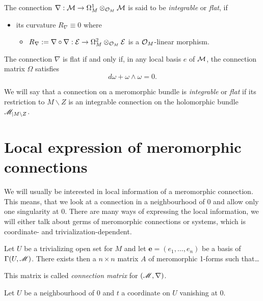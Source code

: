 \begin{defn}[Flatness (0.12.2)]
  The connection $\nabla:\mathcal{M}\to \Omega_M^1\otimes_{\mathcal{O}_M}\mathcal{M}$ is said to be
  \emph{integrable} or \emph{flat}, if
  \begin{itemize}
    \item its curvature $R_\nabla\equiv0$
    where
    \begin{itemize}
      \item $R_\nabla:=\nabla\circ\nabla:\mathcal{E}\to\Omega_M^2\otimes_{\mathcal{O}_M}\mathcal{E}$
        is a $\mathcal{O}_M$-linear morphism.
    \end{itemize}
  \end{itemize}
  \begin{prop}[0.12.4]
    The connection $\nabla$ is flat if and only if, in any local basis $e$ of
    $\mathcal{M}$, the connection matrix $\Omega$ satisfies
    \[
      d\omega + \omega \wedge \omega = 0.
    \]
  \end{prop}
  We will say that a connection on a meromorphic bundle is \emph{integrable} or
  \emph{flat} if its restriction to $M\backslash Z$ is an integrable connection
  on the holomorphic bundle $\mathscr{M}_{|M\backslash Z}$.
\end{defn}

\section{Local expression of meromorphic connections}
\begin{comment}
  \begin{itemize}
    \item \cite{sabbah2007isomonodromic} p.28
    \item \cite{thboalch} p.2
    \item \cite{babbitt1989local} p. 11
  \end{itemize}
\end{comment}
We will usually be interested in local information of a meromorphic connection.
This means, that we look at a connection in a neighbourhood of $0$ and  allow
only one singularity at $0$.
There are many ways of expressing the local information, we will either talk
about germs of meromorphic connections or systems, which is coordinate-
and trivialization-dependent.

\begin{paracol}{2}\sloppy
\switchcolumn[0]\noindent
  Let $U$ be a trivializing open set for $M$ and let
  $\textbf{e}=(e_1,\dots,e_n)$ be a basis of $\Gamma(U,\mathscr{M})$.
  There exists then a $n\times n$ matrix $A$ of meromorphic 1-forms such
  that\dots
  \begin{defn}
    This matrix is called \emph{connection matrix} for $(\mathscr{M},\nabla)$.
  \end{defn}
\switchcolumn[1]\noindent
  Let $U$ be a neighbourhood of $0$ and $t$ a coordinate on $U$ vanishing at
  $0$.
\end{paracol}

